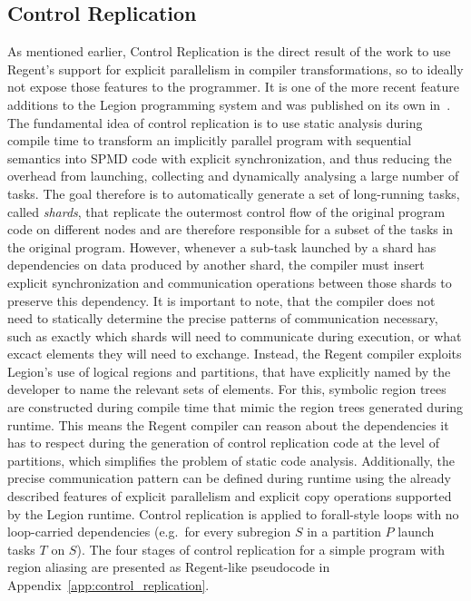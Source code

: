 \documentclass{article}      %
\begin{document}
\subsection{Control Replication}\label{sec:controlRep}
As mentioned earlier, Control Replication is the direct result of the work to use Regent's support for explicit parallelism in compiler transformations, so to ideally not expose those features to the programmer. It is one of the more recent feature additions to the Legion programming system and was published on its own in~\cite{Slaughter2017}. 
The fundamental idea of control replication is to use static analysis during compile time to transform an implicitly parallel program with sequential semantics into SPMD code with explicit synchronization, and thus reducing the overhead from launching, collecting and dynamically analysing a large number of tasks. The goal therefore is to automatically generate a set of long-running tasks, called \emph{shards}, that replicate the outermost control flow of the original program code on different nodes and are therefore responsible for a subset of the tasks in the original program. However, whenever a sub-task launched by a shard has dependencies on data produced by another shard, the compiler must insert explicit synchronization and communication operations between those shards to preserve this dependency. It is important to note, that the compiler does not need to statically determine the precise patterns of communication necessary, such as exactly which shards will need to communicate during execution, or what excact elements they will need to exchange. Instead, the Regent compiler exploits Legion's use of logical regions and partitions, that have explicitly named by the developer to name the relevant sets of elements. For this, symbolic region trees are constructed during compile time that mimic the region trees generated during runtime. This means the Regent compiler can reason about the dependencies it has to respect during the generation of control replication code at the level of partitions, which simplifies the problem of static code analysis. Additionally, the precise communication pattern can be defined during runtime using the already described features of explicit parallelism and explicit copy operations supported by the Legion runtime. Control replication is applied to forall-style loops with no loop-carried dependencies (e.g.\ for every subregion $S$ in a partition $P$ launch tasks $T$ on $S$). The four stages of control replication for a simple program with region aliasing are presented as Regent-like pseudocode in Appendix~\ref{app:control_replication}.
\end{document}
